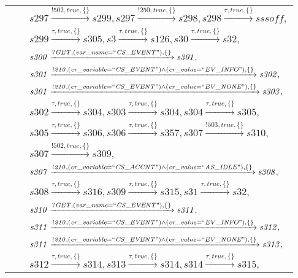 \begin{tabular}{lcp{350px}}
& & $\mathit{s297}\xrightarrow{\mathit{!502}, \mathit{true}, \{\}}\mathit{s299},\mathit{s297}\xrightarrow{\mathit{!250}, \mathit{true}, \{\}}\mathit{s298},\mathit{s298}\xrightarrow{\mathit{\tau}, \mathit{true}, \{\}}\mathit{sssoff},$ \\
& & $\mathit{s299}\xrightarrow{\mathit{\tau}, \mathit{true}, \{\}}\mathit{s305},\mathit{s3}\xrightarrow{\mathit{\tau}, \mathit{true}, \{\}}\mathit{s126},\mathit{s30}\xrightarrow{\mathit{\tau}, \mathit{true}, \{\}}\mathit{s32},$ \\
& & $\mathit{s300}\xrightarrow{\mathit{?GET}, \mathit{(var\_name = ``CS\_EVENT")}, \{\}}\mathit{s301},$ \\
& & $\mathit{s301}\xrightarrow{\mathit{!210}, \mathit{(cr\_variable = ``CS\_EVENT") \land (cr\_value = ``EV\_INFO")}, \{\}}\mathit{s302},$ \\
& & $\mathit{s301}\xrightarrow{\mathit{!210}, \mathit{(cr\_variable = ``CS\_EVENT") \land (cr\_value = ``EV\_NONE")}, \{\}}\mathit{s303},$ \\
& & $\mathit{s302}\xrightarrow{\mathit{\tau}, \mathit{true}, \{\}}\mathit{s304},\mathit{s303}\xrightarrow{\mathit{\tau}, \mathit{true}, \{\}}\mathit{s304},\mathit{s304}\xrightarrow{\mathit{\tau}, \mathit{true}, \{\}}\mathit{s305},$ \\
& & $\mathit{s305}\xrightarrow{\mathit{\tau}, \mathit{true}, \{\}}\mathit{s306},\mathit{s306}\xrightarrow{\mathit{\tau}, \mathit{true}, \{\}}\mathit{s357},\mathit{s307}\xrightarrow{\mathit{!503}, \mathit{true}, \{\}}\mathit{s310},$ \\
& & $\mathit{s307}\xrightarrow{\mathit{!502}, \mathit{true}, \{\}}\mathit{s309},$ \\
& & $\mathit{s307}\xrightarrow{\mathit{!210}, \mathit{(cr\_variable = ``CS\_ACCNT") \land (cr\_value = ``AS\_IDLE")}, \{\}}\mathit{s308},$ \\
& & $\mathit{s308}\xrightarrow{\mathit{\tau}, \mathit{true}, \{\}}\mathit{s316},\mathit{s309}\xrightarrow{\mathit{\tau}, \mathit{true}, \{\}}\mathit{s315},\mathit{s31}\xrightarrow{\mathit{\tau}, \mathit{true}, \{\}}\mathit{s32},$ \\
& & $\mathit{s310}\xrightarrow{\mathit{?GET}, \mathit{(var\_name = ``CS\_EVENT")}, \{\}}\mathit{s311},$ \\
& & $\mathit{s311}\xrightarrow{\mathit{!210}, \mathit{(cr\_variable = ``CS\_EVENT") \land (cr\_value = ``EV\_INFO")}, \{\}}\mathit{s312},$ \\
& & $\mathit{s311}\xrightarrow{\mathit{!210}, \mathit{(cr\_variable = ``CS\_EVENT") \land (cr\_value = ``EV\_NONE")}, \{\}}\mathit{s313},$ \\
& & $\mathit{s312}\xrightarrow{\mathit{\tau}, \mathit{true}, \{\}}\mathit{s314},\mathit{s313}\xrightarrow{\mathit{\tau}, \mathit{true}, \{\}}\mathit{s314},\mathit{s314}\xrightarrow{\mathit{\tau}, \mathit{true}, \{\}}\mathit{s315},$ \\
\end{tabular}


